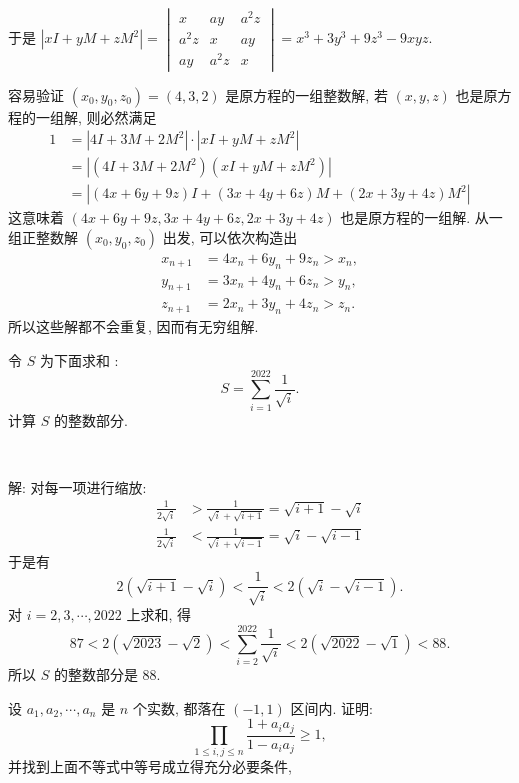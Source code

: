 于是 $|xI + yM + zM^2| = \begin{vmatrix}
x & ay & a^2z \\
a^2z & x & ay \\
ay & a^2z & x
\end{vmatrix} = x^3+3y^3+9z^3-9xyz $.

容易验证 $(x_0,y_0,z_0) = (4,3,2)$ 是原方程的一组整数解, 若 $(x,y,z)$ 也是原方程的一组解, 则必然满足
\begin{align*}
1 &= |4I + 3M + 2M^2|\cdot |xI+yM+zM^2|\\
&= |(4I + 3M + 2M^2)(xI + yM + zM^2)|\\
&= |(4x+6y+9z)I + (3x+4y+6z)M + (2x+3y+4z)M^2|
\end{align*}
这意味着 $(4x+6y+9z, 3x+4y+6z, 2x+3y+4z)$ 也是原方程的一组解. 从一组正整数解 $(x_0, y_0, z_0)$ 出发, 可以依次构造出
\begin{align*}
x_{n+1} &= 4x_n+6y_n+9z_n > x_n,\\
y_{n+1} &= 3x_n+4y_n+6z_n > y_n, \\ 
z_{n+1} &= 2x_n+3y_n+4z_n > z_n.
\end{align*}
所以这些解都不会重复, 因而有无穷组解.

\newpage

令 $S$ 为下面求和 :
\[S = \sum_{i=1}^{2022}{\frac{1}{\sqrt{i}}} .\]
计算 $S$ 的整数部分.

~

解: 对每一项进行缩放:
\begin{align*}
\frac{1}{2\sqrt{i}} &> \frac{1}{\sqrt{i}+\sqrt{i+1}} = \sqrt{i+1}-\sqrt{i} \\
\frac{1}{2\sqrt{i}} &< \frac{1}{\sqrt{i}+\sqrt{i-1}} = \sqrt{i}-\sqrt{i-1}
\end{align*}
于是有
\[2(\sqrt{i+1} - \sqrt{i}) < \frac{1}{\sqrt{i}} < 2(\sqrt{i} - \sqrt{i - 1}) .\]
对 $i=2,3,\cdots,2022$ 上求和, 得
\[87 < 2(\sqrt{2023} - \sqrt{2}) < \sum_{i=2}^{2022}{\frac{1}{\sqrt{i}}} < 2(\sqrt{2022} - \sqrt{1}) < 88 .\]
所以 $S$ 的整数部分是 88.


\newpage
设 $a_1, a_2, \cdots, a_n$ 是 $n$ 个实数, 都落在 $(-1,1)$ 区间内. 证明:
\[\prod_{1\le i,j\le n}\frac{1+a_ia_j}{1-a_ia_j} \ge 1 ,\]
并找到上面不等式中等号成立得充分必要条件,

~

